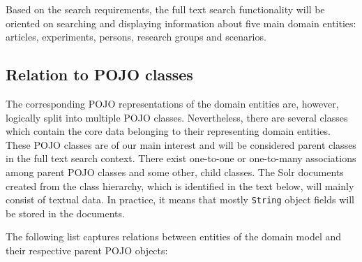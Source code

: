 Based on the search requirements, the full text search functionality will be oriented on searching and displaying information about five main domain entities: articles, experiments, persons, research groups and scenarios.


\subsection{Relation to POJO classes}

The corresponding POJO representations of the domain entities are, however, logically split into multiple POJO classes.
Nevertheless, there are several classes which contain the core data belonging to their representing domain entities.
These POJO classes are of our main interest and will be considered parent classes in the full text search context.
There exist one-to-one or one-to-many associations among parent POJO classes and some other, child classes.  
The Solr documents created from the class hierarchy, which is identified in the text below, will mainly consist of textual data.
In practice, it means that mostly \texttt{String} object fields will be stored in the documents.

The following list captures relations between entities of the domain model and their respective parent POJO objects:

